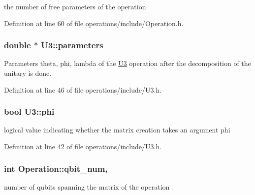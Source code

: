 the number of free parameters of the operation 



Definition at line 60 of file operations/include/\+Operation.\+h.

\subsubsection[{\texorpdfstring{parameters}{parameters}}]{\setlength{\rightskip}{0pt plus 5cm}double $\ast$ U3\+::parameters\hspace{0.3cm}{\ttfamily [protected]}}\hypertarget{class_u3_a6b07be37e63be67b306393a90d759f70}{}\label{class_u3_a6b07be37e63be67b306393a90d759f70}


Parameters theta, phi, lambda of the \hyperlink{class_u3}{U3} operation after the decomposition of the unitary is done. 



Definition at line 46 of file operations/include/\+U3.\+h.

\subsubsection[{\texorpdfstring{phi}{phi}}]{\setlength{\rightskip}{0pt plus 5cm}bool U3\+::phi\hspace{0.3cm}{\ttfamily [protected]}}\hypertarget{class_u3_ac705d31d768b918da78d8b058ec6c6c3}{}\label{class_u3_ac705d31d768b918da78d8b058ec6c6c3}


logical value indicating whether the matrix creation takes an argument phi 



Definition at line 42 of file operations/include/\+U3.\+h.

\subsubsection[{\texorpdfstring{qbit\+\_\+num}{qbit_num}}]{\setlength{\rightskip}{0pt plus 5cm}int Operation\+::qbit\+\_\+num\hspace{0.3cm}{\ttfamily [protected]}, {\ttfamily [inherited]}}\hypertarget{class_operation_aecd5fbf1dd4ea532b2e58471ff8bad69}{}\label{class_operation_aecd5fbf1dd4ea532b2e58471ff8bad69}


number of qubits spanning the matrix of the operation 



